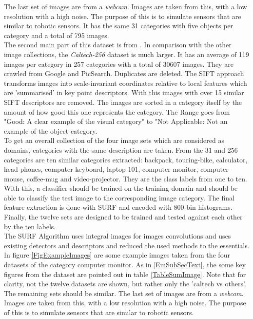 The last set of images are from a \textit{webcam}.
Images are taken from this, with a low resolution with a high noise. The purpose of this is to simulate sensors that are similar to robotic sensors.
It has the same 31 categories with five objects per category and a total of 795 images. \\
The second main part of this dataset is from \cite{GregGriffin.}. In comparison with the other image collections, the \textit{Caltech-256} dataset is much larger.
It has an average of 119 images per category in 257 categories with a total of 30607 images.
They are crawled from Google and PicSearch.
Duplicates are deleted. The \ac{SIFT} approach transforms images into scale-invariant coordinates relative to local features which are 'summarised' in key point descriptors.\cite{Lowe.2004}
With this images with over 15 similar \acs{SIFT} descriptors are removed.
The images are sorted in a category itself by the amount of how good this one represents the category.
The Range goes from "Good: A clear example of the visual category" to "Not Applicable: Not an example of the object category.\cite[p.3]{GregGriffin.}\\
To get an overall collection of the four image sets which are considered as domains, categories with the same description are taken.
From the 31 and 256 categories are ten similar categories extracted:
backpack, touring-bike, calculator, head-phones, computer-keyboard, laptop-101, computer-monitor, computer-mouse, coffee-mug and video-projector.
They are the class labels from one to ten. 
With this, a classifier should be trained on the training domain and should be able to classify the test image to the corresponding image category.
The final feature extraction is done with \ac{SURF} and encoded with 800-bin histograms.
Finally, the twelve sets are designed to be trained and tested against each other by the ten labels.\cite{Gong.} \\
The \ac{SURF} Algorithm uses integral images for images convolutions and uses existing detectors and descriptors and reduced the used methods to the essentials. \cite{vanBay.2006} 
In figure \ref{FigExampleImages} are some example images taken from the four datasets of the category computer monitor. 
As in \ref{EmSubSecText}, the some key figures from the dataset are pointed out in table \ref{TableSumImage}.
Note that for clarity, not the twelve datasets are shown, but rather only the 'caltech vs others'.
The remaining sets should be similar.
The last set of images are from a \textit{webcam}.
Images are taken from this, with a low resolution with a high noise. The purpose of this is to simulate sensors that are similar to robotic sensors.
